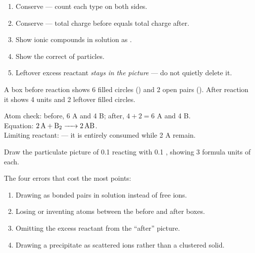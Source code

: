 \documentclass{apchem-notes}
\begin{document}

\begin{enumerate}[leftmargin=*,itemsep=0.2em]
  \item Conserve  --- count each type on both
        sides.
  \item Conserve  --- total charge before equals
        total charge after.
  \item Show ionic compounds in solution as
        .
  \item Show the correct  of particles.
  \item Leftover excess reactant \emph{stays in the picture} --- do not
        quietly delete it.
\end{enumerate}

\begin{workedexample}
A box before reaction shows 6 filled circles () and 2 open pairs
(). After reaction it shows 4  units and 2 leftover filled
circles.

Atom check: before, 6 A and 4 B; after, $4 + 2 = 6$ A and 4 B. \checkmark\\
Equation: $\ce{2 A + B2 -> 2 AB}$. \\
Limiting reactant:  --- it is entirely consumed while 2 A remain.
\end{workedexample}


Draw the particulate picture of \SI{0.1}{\Molar}  reacting with
\SI{0.1}{\Molar} , showing 3 formula units of each.
\workspace[4cm]



\begin{apctrap}
The four errors that cost the most points:
\begin{enumerate}[leftmargin=*,itemsep=0.1em]
  \item Drawing  as bonded pairs in solution instead of free ions.
  \item Losing or inventing atoms between the before and after boxes.
  \item Omitting the excess reactant from the ``after'' picture.
  \item Drawing a precipitate as scattered ions rather than a clustered
        solid.
\end{enumerate}
\end{apctrap}
\end{document}
